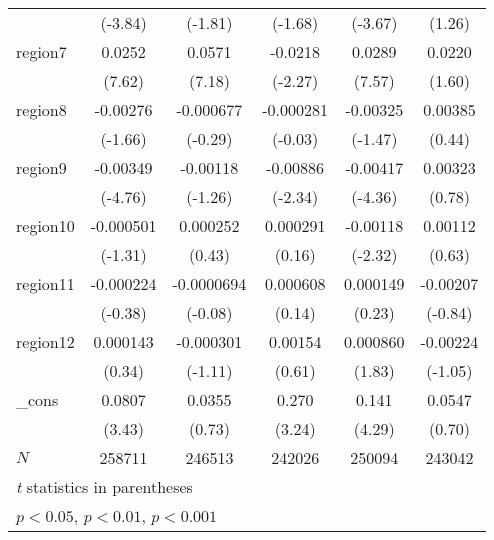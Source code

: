 \begin{table}[htbp]
\begin{tabular}{l*{5}{c}}
            &     (-3.84)         &     (-1.81)         &     (-1.68)         &     (-3.67)         &      (1.26)         \\
region7     &      0.0252\sym{***}&      0.0571\sym{***}&     -0.0218\sym{*}  &      0.0289\sym{***}&      0.0220         \\
            &      (7.62)         &      (7.18)         &     (-2.27)         &      (7.57)         &      (1.60)         \\
region8     &    -0.00276         &   -0.000677         &   -0.000281         &    -0.00325         &     0.00385         \\
            &     (-1.66)         &     (-0.29)         &     (-0.03)         &     (-1.47)         &      (0.44)         \\
region9     &    -0.00349\sym{***}&    -0.00118         &    -0.00886\sym{*}  &    -0.00417\sym{***}&     0.00323         \\
            &     (-4.76)         &     (-1.26)         &     (-2.34)         &     (-4.36)         &      (0.78)         \\
region10    &   -0.000501         &    0.000252         &    0.000291         &    -0.00118\sym{*}  &     0.00112         \\
            &     (-1.31)         &      (0.43)         &      (0.16)         &     (-2.32)         &      (0.63)         \\
region11    &   -0.000224         &  -0.0000694         &    0.000608         &    0.000149         &    -0.00207         \\
            &     (-0.38)         &     (-0.08)         &      (0.14)         &      (0.23)         &     (-0.84)         \\
region12    &    0.000143         &   -0.000301         &     0.00154         &    0.000860         &    -0.00224         \\
            &      (0.34)         &     (-1.11)         &      (0.61)         &      (1.83)         &     (-1.05)         \\
\_cons      &      0.0807\sym{***}&      0.0355         &       0.270\sym{**} &       0.141\sym{***}&      0.0547         \\
            &      (3.43)         &      (0.73)         &      (3.24)         &      (4.29)         &      (0.70)         \\
\hline
\(N\)       &      258711         &      246513         &      242026         &      250094         &      243042         \\
\hline\hline
\multicolumn{6}{l}{\footnotesize \textit{t} statistics in parentheses}\\
\multicolumn{6}{l}{\footnotesize \sym{*} \(p<0.05\), \sym{**} \(p<0.01\), \sym{***} \(p<0.001\)}\\
\end{tabular}
\label{tab:oaxaca_female_nonclustered}
\end{table}
